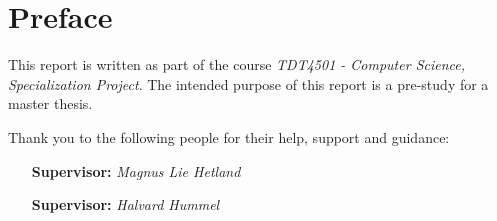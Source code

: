 \chapter{Preface}\label{chp:preface}

This report is written as part of the course \textit{TDT4501 - Computer Science, Specialization Project}. The intended purpose of this report is a pre-study for a master thesis. 

Thank you to the following people for their help, support and guidance:
\begin{itemize}[leftmargin=8em]
    \item[\textbf{Supervisor:}] \textit{Magnus Lie Hetland}
    \item[\textbf{Supervisor:}] \textit{Halvard Hummel}
\end{itemize}